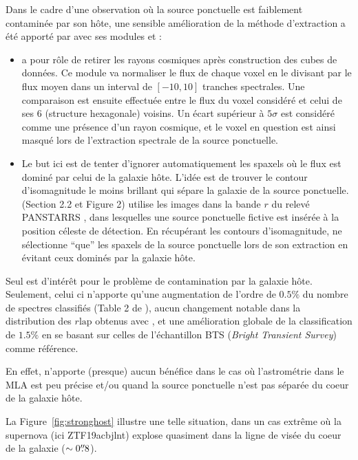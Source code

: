 \documentclass[../main/main.tex]{subfiles}
\begin{document}
Dans le cadre d'une observation où la source ponctuelle est faiblement
contaminée par son hôte, une sensible amélioration
de la méthode d'extraction a été apporté par \citet{Kimcontsep} avec ses
modules  et :

\begin{itemize}[label=$\bullet$]
\itemsep0em 
\item \textbf{} a pour rôle de retirer
les rayons cosmiques après construction des cubes de données. Ce module va
normaliser le flux de chaque voxel en le divisant par le flux moyen dans
un interval de $[-10,10]$ tranches spectrales. Une
comparaison est ensuite effectuée entre le flux du voxel considéré et celui de ses $6$
(structure hexagonale)
voisins. Un écart supérieur à $5\sigma$ est considéré comme une présence
d'un rayon cosmique, et le voxel en question est ainsi masqué lors de
l'extraction spectrale de la source ponctuelle.
\item \textbf{} Le but ici est de tenter d'ignorer
  automatiquement les spaxels où le flux est dominé par celui de la
  galaxie hôte. L'idée est de trouver le contour d'isomagnitude le moins
  brillant qui sépare la galaxie de la source
  ponctuelle. \citet{Kimcontsep} (Section 2.2 et Figure 2) utilise les images dans
  la bande $r$ du relevé PANSTARRS \citep{ChambersPanstarrs}, dans
  lesquelles une source ponctuelle fictive est insérée à
  la position céleste de détection. En récupérant les
  contours d'isomagnitude,  ne sélectionne ``que'' les spaxels
  de la source ponctuelle lors de son extraction en évitant ceux dominés
  par la
  galaxie hôte.
\end{itemize}

Seul  est d'intérêt pour le problème de contamination par
la galaxie hôte. Seulement, celui ci n'apporte qu'une augmentation de
l'ordre de $0.5\%$ du nombre de spectres classifiés (Table 2 de
\citet{Kimcontsep}), aucun changement notable dans la distribution des
$r\text{lap}$ obtenus avec , et une amélioration globale de la
classification de $1.5\%$ en se basant sur celles de l'échantillon BTS
(\textit{Bright Transient Survey}) comme référence.

En effet,  n'apporte (presque) aucun bénéfice dans le cas où
l'astrométrie dans le MLA est peu précise et/ou quand la source ponctuelle n'est pas
séparée du coeur de la galaxie hôte.

La Figure~\ref{fig:stronghost} illustre une telle situation, dans un cas
extrême où la supernova (ici ZTF19acbjlnt) explose quasiment dans la ligne de visée du
coeur de la galaxie ($\sim0\overset{\prime\prime}{.}8$).
\end{document}
